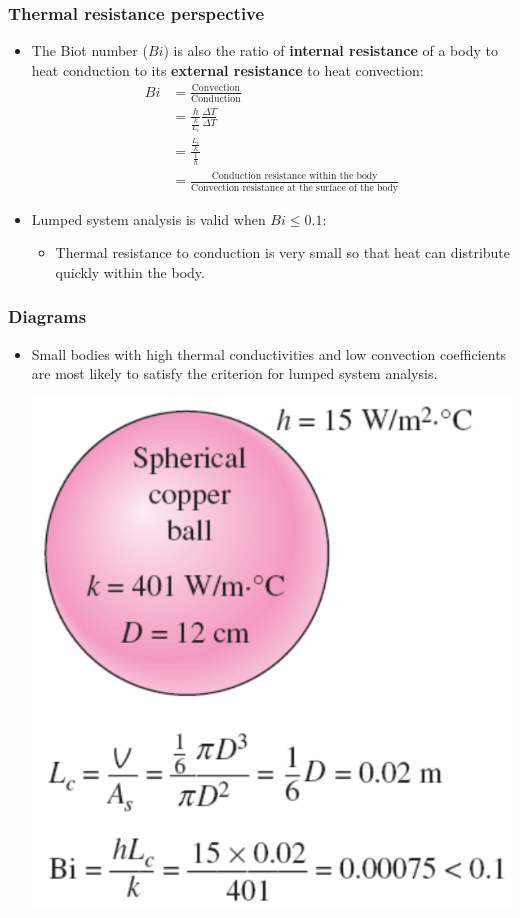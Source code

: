 \documentclass[11pt]{article}
\begin{document}
\subsubsection{Thermal resistance perspective}
\label{sec:org3793c31}
\begin{itemize}
\item The Biot number (\(Bi\)) is also the ratio of \textbf{internal resistance} of a body to heat conduction to its \textbf{external resistance} to heat convection:
\begin{align*}
Bi &= \frac{\text{Convection}}{\text{Conduction}} \\
&= \frac{h}{\frac{k}{L_c}} \frac{\Delta T}{\Delta T} \\
&= \frac{\frac{L_c}{k}}{\frac{1}{h}} \\
&= \frac{\text{Conduction resistance within the body}}{\text{Convection resistance at the surface of the body}}
\end{align*}
\item Lumped system analysis is valid when \(Bi \le 0.1\):
\begin{itemize}
\item Thermal resistance to conduction is very small so that heat can distribute quickly within the body.
\end{itemize}
\end{itemize}

 \newpage
\subsubsection{Diagrams}
\label{sec:org57fc318}
\begin{itemize}
\item Small bodies with high thermal conductivities and low convection coefficients are most likely to satisfy the criterion for lumped system analysis.
\begin{center}
\includegraphics[width=.9\linewidth]{./images/biot-number-spherical-copper-ball.png}
\end{center}
\end{itemize}
\end{document}
